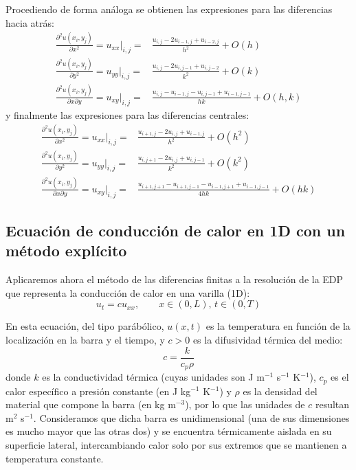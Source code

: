 Procediendo de forma análoga se obtienen las expresiones para las diferencias hacia atrás:
\begin{align*}
 \frac{\partial^2 u(x_i, y_j)}{\partial x^2} = u_{xx} \Bigr|_{i,j} =& \frac{u_{i,j} - 2 u_{i-1,j} + u_{i-2,j}}{h^2} + O(h) \\
 \frac{\partial^2u(x_i, y_j)}{\partial y^2} = u_{yy} \Bigr|_{i,j} =& \frac{u_{i,j}- 2 u_{i, j-1} + u_{i,j-2}}{k^2} + O(k) \\
 \frac{\partial^2u(x_i, y_j)}{\partial x \partial y} = u_{xy} \Bigr|_{i,j} =& \frac{u_{i, j} - u_{i-1, j} - u_{i, j-1} + u_{i-1,j-1}}{hk} + O(h,k)
\end{align*}
y finalmente las expresiones para las diferencias centrales:
\begin{align*}
 \frac{\partial^2 u(x_i, y_j)}{\partial x^2} = u_{xx} \Bigr|_{i,j} =& \frac{u_{i+1, j} - 2 u_{i,j} + u_{i-1, j}}{h^2} + O(h^2) \\
 \frac{\partial^2u(x_i, y_j)}{\partial y^2} = u_{yy} \Bigr|_{i,j} =& \frac{u_{i,j+1} - 2 u_{i,j} + u_{i, j-1}}{k^2} + O(k^2) \\
 \frac{\partial^2u(x_i, y_j)}{\partial x \partial y} = u_{xy} \Bigr|_{i,j} =& \frac{u_{i+1, j+1} - u_{i+1, j-1} - u_{i-1, j+1} + u_{i-1, j-1}}{4hk} + O(hk)
\end{align*}

\subsection{Ecuación de conducción de calor en 1D con un método explícito} \label{subsec:calor_explicito}
Aplicaremos ahora el método de las diferencias finitas a la resolución de la EDP que representa la conducción de calor en una varilla (1D):
\begin{equation}\label{eq:calor1}
 u_t = c u_{xx}, \qquad x \in (0, L), \, t \in  (0, T)
\end{equation} 

En esta ecuación, del tipo parábólico, $u(x,t)$ es la temperatura en función de la localización en la barra y el tiempo, y $c >0$ es la difusividad térmica del medio:
\[c = \frac{k}{c_p \rho}\]
donde $k$ es la conductividad térmica (cuyas unidades son J m$^{-1}$ s$^{-1}$ K$^{-1}$), $c_p$ es el calor específico a presión constante (en J kg$^{-1}$ K$^{-1}$) y $\rho$ es la densidad del material que compone la barra (en kg m$^{-3}$), por lo que las unidades de $c$ resultan m$^{2}$ s$^{-1}$. Consideramos que dicha barra es unidimensional (una de sus dimensiones es mucho mayor que las otras dos) y se encuentra térmicamente aislada en su superficie lateral, intercambiando calor solo por sus extremos que se mantienen a temperatura constante.

